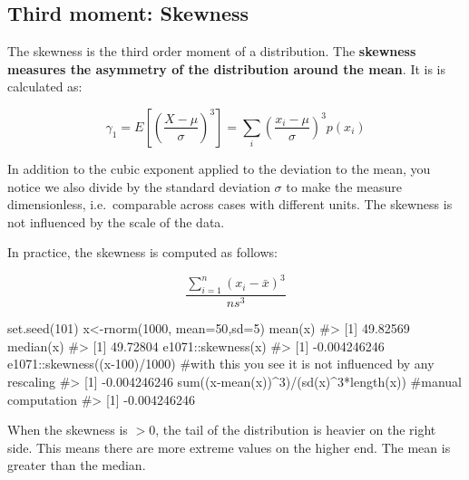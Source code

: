 \documentclass[
  letterpaper,
  DIV=11,
  numbers=noendperiod]{scrreprt}
\newenvironment{Shaded}{\begin{snugshade}}{\end{snugshade}}
\newcommand{\AttributeTok}[1]{\textcolor[rgb]{0.40,0.45,0.13}{#1}}
\newcommand{\CommentTok}[1]{\textcolor[rgb]{0.37,0.37,0.37}{#1}}
\newcommand{\DecValTok}[1]{\textcolor[rgb]{0.68,0.00,0.00}{#1}}
\newcommand{\FunctionTok}[1]{\textcolor[rgb]{0.28,0.35,0.67}{#1}}
\newcommand{\NormalTok}[1]{\textcolor[rgb]{0.00,0.23,0.31}{#1}}
\newcommand{\OtherTok}[1]{\textcolor[rgb]{0.00,0.23,0.31}{#1}}
\newcommand{\SpecialCharTok}[1]{\textcolor[rgb]{0.37,0.37,0.37}{#1}}
\begin{document}
\subsection{Third moment: Skewness}\label{third-moment-skewness}

The skewness is the third order moment of a distribution. The
\textbf{skewness measures the asymmetry of the distribution around the
mean}. It is is calculated as:

\[\gamma_1 = E\left[\left(\frac{X - \mu}{\sigma}\right)^3\right] = \sum_{i} \left(\frac{x_i - \mu}{\sigma}\right)^3 p(x_i)\]

In addition to the cubic exponent applied to the deviation to the mean,
you notice we also divide by the standard deviation \(\sigma\) to make
the measure dimensionless, i.e.~comparable across cases with different
units. The skewness is not influenced by the scale of the data.

In practice, the skewness is computed as follows:

\[\dfrac {\sum_{i=1}^{n} (x_i - \bar{x})^3} {n s^3}\]

\begin{Shaded}
\begin{Highlighting}[]
\FunctionTok{set.seed}\NormalTok{(}\DecValTok{101}\NormalTok{)}
\NormalTok{x}\OtherTok{\textless{}{-}}\FunctionTok{rnorm}\NormalTok{(}\DecValTok{1000}\NormalTok{, }\AttributeTok{mean=}\DecValTok{50}\NormalTok{,}\AttributeTok{sd=}\DecValTok{5}\NormalTok{)}
\FunctionTok{mean}\NormalTok{(x)}
\CommentTok{\#\textgreater{} [1] 49.82569}
\FunctionTok{median}\NormalTok{(x)}
\CommentTok{\#\textgreater{} [1] 49.72804}
\NormalTok{e1071}\SpecialCharTok{::}\FunctionTok{skewness}\NormalTok{(x)}
\CommentTok{\#\textgreater{} [1] {-}0.004246246}
\NormalTok{e1071}\SpecialCharTok{::}\FunctionTok{skewness}\NormalTok{((x}\DecValTok{{-}100}\NormalTok{)}\SpecialCharTok{/}\DecValTok{1000}\NormalTok{) }\CommentTok{\#with this you see it is not influenced by any rescaling}
\CommentTok{\#\textgreater{} [1] {-}0.004246246}
\FunctionTok{sum}\NormalTok{((x}\SpecialCharTok{{-}}\FunctionTok{mean}\NormalTok{(x))}\SpecialCharTok{\^{}}\DecValTok{3}\NormalTok{)}\SpecialCharTok{/}\NormalTok{(}\FunctionTok{sd}\NormalTok{(x)}\SpecialCharTok{\^{}}\DecValTok{3}\SpecialCharTok{*}\FunctionTok{length}\NormalTok{(x)) }\CommentTok{\#manual computation}
\CommentTok{\#\textgreater{} [1] {-}0.004246246}
\end{Highlighting}
\end{Shaded}

When the skewness is \(>0\), the tail of the distribution is heavier on
the right side. This means there are more extreme values on the higher
end. The mean is greater than the median.
\end{document}
